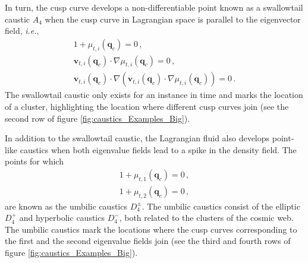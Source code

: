 \documentclass[a4paper, 11pt]{article}
\begin{document}
\bigskip
In turn, the cusp curve develops a non-differentiable point known as a swallowtail caustic $A_4$ when the cusp curve in Lagrangian space is parallel to the eigenvector field, \textit{i.e.},
\begin{align}
1+\mu_{t,i}(\bm{q}_c)=0\,,\\
\bm{v}_{t,i}(\bm{q}_c) \cdot \nabla \mu_{t,i}(\bm{q}_c)=0\,,\\
\bm{v}_{t,i}(\bm{q}_c) \cdot \nabla (\bm{v}_{t,i}(\bm{q}_c) \cdot \nabla \mu_{t,i}(\bm{q}_c)) = 0\,.
\end{align}
The swallowtail caustic only exists for an instance in time and marks the location of a cluster, highlighting the location where different cusp curves join (see the second row of figure \ref{fig:caustics_Examples_Big}). 

\bigskip
In addition to the swallowtail caustic, the Lagrangian fluid also develops point-like caustics when both eigenvalue fields lead to a spike in the density field. The points for which
\begin{align}
1+\mu_{t,1}(\bm{q}_c) =0\,,\\
1+\mu_{t,2}(\bm{q}_c) = 0\,,
\end{align}
are known as the umbilic caustics $D_4^\pm$. The umbilic caustics consist of the elliptic $D_4^+$ and hyperbolic caustics $D_4^-$, both related to the clusters of the cosmic web. The umbilic caustics mark the locations where the cusp curves corresponding to the first and the second eigenvalue fields join (see the third and fourth rows of figure \ref{fig:caustics_Examples_Big}). 
\end{document}
